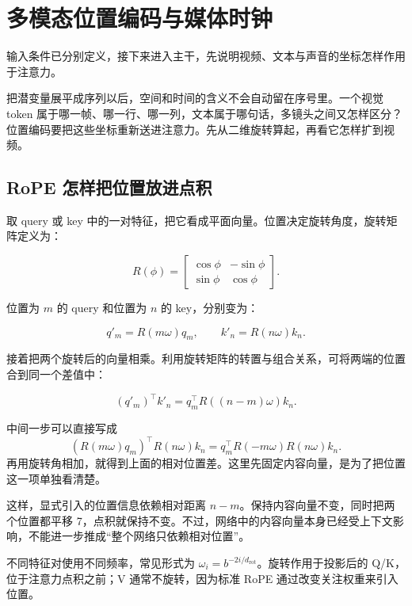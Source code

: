 \chapter{多模态位置编码与媒体时钟}\label{seedance-m04}

输入条件已分别定义，接下来进入主干，先说明视频、文本与声音的坐标怎样作用于注意力。

把潜变量展平成序列以后，空间和时间的含义不会自动留在序号里。一个视觉 token 属于哪一帧、哪一行、哪一列，文本属于哪句话，多镜头之间又怎样区分？位置编码要把这些坐标重新送进注意力。先从二维旋转算起，再看它怎样扩到视频。

\section{RoPE 怎样把位置放进点积}\label{seedance-m04-rope-ux600eux6837ux628aux4f4dux7f6eux653eux8fdbux70b9ux79ef}

取 query 或 key 中的一对特征，把它看成平面向量。位置决定旋转角度，旋转矩阵定义为：

\[
R(\phi)=\begin{bmatrix}
\cos\phi&-\sin\phi\\
\sin\phi&\cos\phi
\end{bmatrix}.
\]

位置为 \(m\) 的 query 和位置为 \(n\) 的 key，分别变为：

\[
q'_m=R(m\omega)q_m,\qquad k'_n=R(n\omega)k_n.
\]

接着把两个旋转后的向量相乘。利用旋转矩阵的转置与组合关系，可将两端的位置合到同一个差值中：

\[
(q'_m)^\top k'_n=q_m^\top R((n-m)\omega)k_n.
\]

中间一步可以直接写成
\[
(R(m\omega)q_m)^\top R(n\omega)k_n
=q_m^\top R(-m\omega)R(n\omega)k_n.
\]
再用旋转角相加，就得到上面的相对位置差。这里先固定内容向量，是为了把位置这一项单独看清楚。

这样，显式引入的位置信息依赖相对距离 \(n-m\)。保持内容向量不变，同时把两个位置都平移 7，点积就保持不变。不过，网络中的内容向量本身已经受上下文影响，不能进一步推成``整个网络只依赖相对位置''。

不同特征对使用不同频率，常见形式为 \(\omega_i=b^{-2i/d_{\mathrm{rot}}}\)。旋转作用于投影后的 Q/K，位于注意力点积之前；V 通常不旋转，因为标准 RoPE 通过改变关注权重来引入位置。

